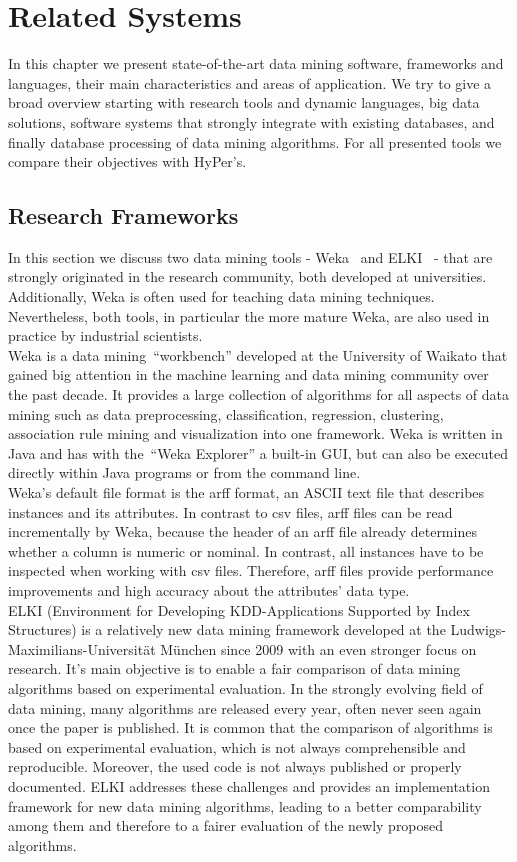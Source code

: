 \chapter{Related Systems}\label{chapter:related}

In this chapter we present state-of-the-art data mining software, frameworks and languages, their main characteristics and areas of application. We try to give a broad overview starting with research tools and dynamic languages, big data solutions, software systems that strongly integrate with existing databases, and finally database processing of data mining algorithms. For all presented tools we compare their objectives with HyPer's.

\section{Research Frameworks}
In this section we discuss two data mining tools - Weka~\parencite{Hall:2009:WDM:1656274.1656278} and ELKI~\parencite{DBLP:conf/ssdbm/AchtertKZ08} - that are strongly originated in the research community, both developed at universities. Additionally, Weka is often used for teaching data mining techniques. Nevertheless, both tools, in particular the more mature Weka, are also used in practice by industrial scientists.
\\
Weka is a data mining~\enquote{workbench} developed at the University of Waikato that gained big attention in the machine learning and data mining community over the past decade. It provides a large collection of algorithms for all aspects of data mining such as data preprocessing, classification, regression, clustering, association rule mining and visualization into one framework. Weka is written in Java and has with the~\enquote{Weka Explorer} a built-in GUI, but can also be executed directly within Java programs or from the command line. 
\\
Weka's default file format is the arff format, an ASCII text file that describes instances and its attributes. In contrast to csv files, arff files can be read incrementally by Weka, because the header of an arff file already determines whether a column is numeric or nominal. In contrast, all instances have to be inspected when working with csv files. Therefore, arff files provide performance improvements and high accuracy about the attributes' data type.
\\
ELKI (Environment for Developing KDD-Applications Supported by Index Structures) is a relatively new data mining framework developed at the Ludwigs-Maximilians-Universität München since 2009 with an even stronger focus on research. It's main objective is to enable a fair comparison of data mining algorithms based on experimental evaluation. In the strongly evolving field of data mining, many algorithms are released every year, often never seen again once the paper is published. It is common that the comparison of algorithms is based on experimental evaluation, which is not always comprehensible and reproducible. Moreover, the used code is not always published or properly documented. ELKI addresses these challenges and provides an implementation framework for new data mining algorithms, leading to a better comparability among them and therefore to a fairer evaluation of the newly proposed algorithms. 
